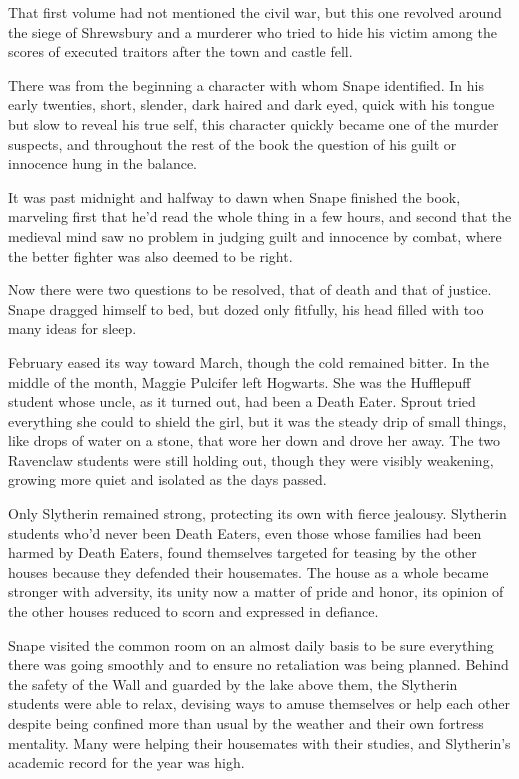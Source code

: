 That first volume had not mentioned the civil war, but this one revolved around the siege of Shrewsbury and a murderer who tried to hide his victim among the scores of executed traitors after the town and castle fell.

There was from the beginning a character with whom Snape identified. In his early twenties, short, slender, dark haired and dark eyed, quick with his tongue but slow to reveal his true self, this character quickly became one of the murder suspects, and throughout the rest of the book the question of his guilt or innocence hung in the balance.

It was past midnight and halfway to dawn when Snape finished the book, marveling first that he'd read the whole thing in a few hours, and second that the medieval mind saw no problem in judging guilt and innocence by combat, where the better fighter was also deemed to be right.

Now there were two questions to be resolved, that of death and that of justice. Snape dragged himself to bed, but dozed only fitfully, his head filled with too many ideas for sleep.

February eased its way toward March, though the cold remained bitter. In the middle of the month, Maggie Pulcifer left Hogwarts. She was the Hufflepuff student whose uncle, as it turned out, had been a Death Eater. Sprout tried everything she could to shield the girl, but it was the steady drip of small things, like drops of water on a stone, that wore her down and drove her away. The two Ravenclaw students were still holding out, though they were visibly weakening, growing more quiet and isolated as the days passed.

Only Slytherin remained strong, protecting its own with fierce jealousy. Slytherin students who'd never been Death Eaters, even those whose families had been harmed by Death Eaters, found themselves targeted for teasing by the other houses because they defended their housemates. The house as a whole became stronger with adversity, its unity now a matter of pride and honor, its opinion of the other houses reduced to scorn and expressed in defiance.

Snape visited the common room on an almost daily basis to be sure everything there was going smoothly and to ensure no retaliation was being planned. Behind the safety of the Wall and guarded by the lake above them, the Slytherin students were able to relax, devising ways to amuse themselves or help each other despite being confined more than usual by the weather and their own fortress mentality. Many were helping their housemates with their studies, and Slytherin's academic record for the year was high.

